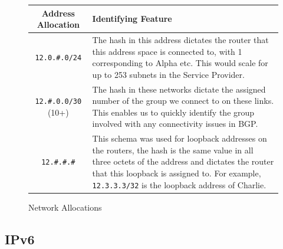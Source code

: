 \begin{figure}[!ht]
    \caption{Network Allocations}
    \label{figure:network-alloc-2}
    \centering
    \begin{tabular}{|c|p{8cm}|}
        \hline
        \textbf{Address Allocation} & \textbf{Identifying Feature} \\

        \hline
        \texttt{12.0.\#.0/24} & The hash in this address dictates the router that
        this address space is connected to, with 1 corresponding to Alpha etc.
        This would scale for up to 253 subnets in the Service Provider.\\

        \hline
        \texttt{12.\#.0.0/30} (10+) & The hash in these networks dictate the assigned
        number of the group we connect to on these links. This enables us to
        quickly identify the group involved with any connectivity issues in
        BGP.\\

        \hline
        \texttt{12.\#.\#.\#} & This schema was used for loopback addresses on the
        routers, the hash is the same value in all three octets of the address
        and dictates the router that this loopback is assigned to. For example,
        \texttt{12.3.3.3/32} is the loopback address of Charlie.\\
        \hline
    \end{tabular}
\end{figure}
\clearpage

\subsection{IPv6}